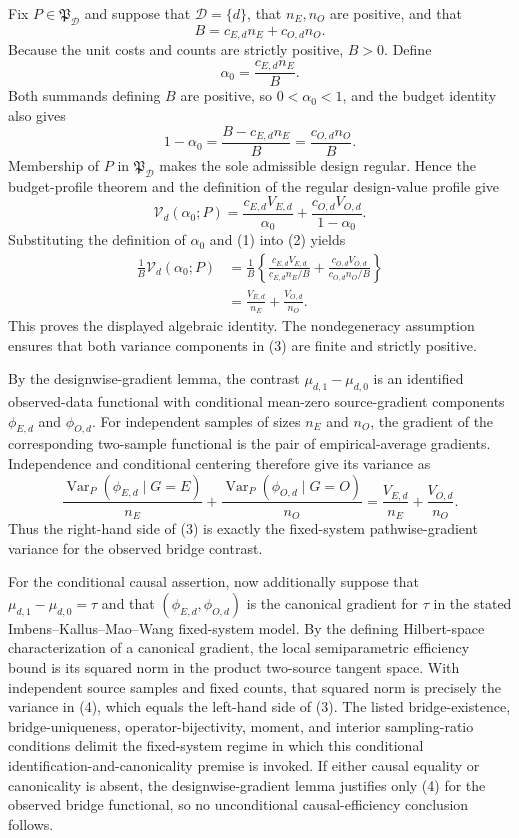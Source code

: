 Fix \(P\in\mathfrak P_{\mathcal D}\) and suppose that \(\mathcal D=\{d\}\), that \(n_E,n_O\) are positive, and that
\[
 B=c_{E,d}n_E+c_{O,d}n_O.
\]
Because the unit costs and counts are strictly positive, \(B>0\).  Define
\[
 \alpha_0=\frac{c_{E,d}n_E}{B}.
\]
Both summands defining \(B\) are positive, so \(0<\alpha_0<1\), and the budget identity also gives
\[
 1-\alpha_0
 =\frac{B-c_{E,d}n_E}{B}
 =\frac{c_{O,d}n_O}{B}.                                      \tag{1}
\]
Membership of \(P\) in \(\mathfrak P_{\mathcal D}\) makes the sole admissible design regular.  Hence the budget-profile theorem and the definition of the regular design-value profile give
\[
 \mathcal V_d(\alpha_0;P)
 =\frac{c_{E,d}V_{E,d}}{\alpha_0}
  +\frac{c_{O,d}V_{O,d}}{1-\alpha_0}.                         \tag{2}
\]
Substituting the definition of \(\alpha_0\) and (1) into (2) yields
\[
\begin{aligned}
 \frac{1}{B}\mathcal V_d(\alpha_0;P)
 &=\frac{1}{B}\left\{
   \frac{c_{E,d}V_{E,d}}{c_{E,d}n_E/B}
   +\frac{c_{O,d}V_{O,d}}{c_{O,d}n_O/B}
   \right\}\\
 &=\frac{V_{E,d}}{n_E}+\frac{V_{O,d}}{n_O}.                  \tag{3}
\end{aligned}
\]
This proves the displayed algebraic identity.  The nondegeneracy assumption ensures that both variance components in (3) are finite and strictly positive.

By the designwise-gradient lemma, the contrast \(\mu_{d,1}-\mu_{d,0}\) is an identified observed-data functional with conditional mean-zero source-gradient components \(\phi_{E,d}\) and \(\phi_{O,d}\).  For independent samples of sizes \(n_E\) and \(n_O\), the gradient of the corresponding two-sample functional is the pair of empirical-average gradients.  Independence and conditional centering therefore give its variance as
\[
 \frac{\operatorname{Var}_P(\phi_{E,d}\mid G=E)}{n_E}
 +\frac{\operatorname{Var}_P(\phi_{O,d}\mid G=O)}{n_O}
 =\frac{V_{E,d}}{n_E}+\frac{V_{O,d}}{n_O}.                  \tag{4}
\]
Thus the right-hand side of (3) is exactly the fixed-system pathwise-gradient variance for the observed bridge contrast.

For the conditional causal assertion, now additionally suppose that \(\mu_{d,1}-\mu_{d,0}=\tau\) and that \((\phi_{E,d},\phi_{O,d})\) is the canonical gradient for \(\tau\) in the stated Imbens--Kallus--Mao--Wang fixed-system model.  By the defining Hilbert-space characterization of a canonical gradient, the local semiparametric efficiency bound is its squared norm in the product two-source tangent space.  With independent source samples and fixed counts, that squared norm is precisely the variance in (4), which equals the left-hand side of (3).  The listed bridge-existence, bridge-uniqueness, operator-bijectivity, moment, and interior sampling-ratio conditions delimit the fixed-system regime in which this conditional identification-and-canonicality premise is invoked.  If either causal equality or canonicality is absent, the designwise-gradient lemma justifies only (4) for the observed bridge functional, so no unconditional causal-efficiency conclusion follows.